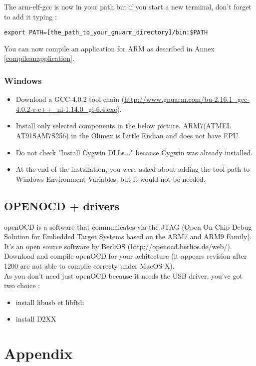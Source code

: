 The arm-elf-gcc is now in your path but if you start a new terminal, don't forget to add it typing : 
\begin{verbatim}
export PATH=[the_path_to_your_gnuarm_directory]/bin:$PATH
\end{verbatim}

You can now compile an application for ARM as described in Annex \ref{compileanapplication}.


\subsection{Windows}
\begin{itemize}
\item Download a GCC-4.0.2 tool chain (\href{http://www.gnuarm.com/bu-2.16.1_gcc-4.0.2-c-c++_nl-1.14.0_gi-6.4.exe}{http://www.gnuarm.com/bu-2.16.1_gcc-4.0.2-c-c++_nl-1.14.0_gi-6.4.exe}).
\item Install only selected components in the below picture. ARM7(ATMEL AT91SAM7S256) in the Olimex is Little Endian and does not have FPU.
\item Do not check "Install Cygwin DLLs..." because Cygwin was already installed.\\
\item At the end of the installation, you were asked about adding the tool path to Windows Environment Variables, but it would not be needed.
\end{itemize}

\section{OPENOCD + drivers} \label{drivers}
openOCD is a software that communicates via the JTAG (Open On-Chip Debug Solution for Embedded Target Systems based on the ARM7 and ARM9 Family). It's an open source software by BerliOS (http://openocd.berlios.de/web/). \\
Download and compile openOCD for your achitecture (it appears revision after 1200 are not able to compile correcty under MacOS X).\\
As you don't need just openOCD because it needs the USB driver, you've got two choice : 
\begin{itemize}
\item install libusb et libftdi
\item install D2XX
\end{itemize}

\newpage
\chapter{Appendix}
